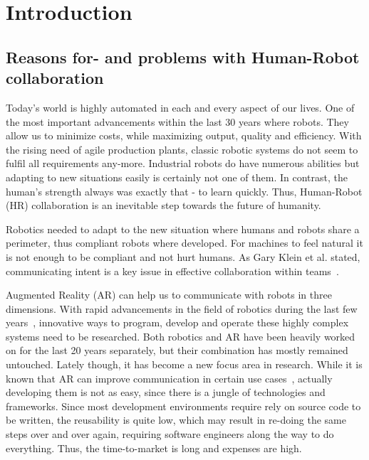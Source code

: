 \chapter{Introduction}\label{Chap:Introduction}

\section{Reasons for- and problems with Human-Robot collaboration}\label{Section:ProblemDescription}
Today's world is highly automated in each and every aspect of our lives. One of the most important advancements within the last 30 years where robots. They allow us to minimize costs, while maximizing output, quality and efficiency. With the rising need of agile production plants, classic robotic systems do not seem to fulfil all requirements any-more. Industrial robots do have numerous abilities but adapting to new situations easily is certainly not one of them. In contrast, the human's strength always was exactly that - to learn quickly. Thus, Human-Robot (HR) collaboration is an inevitable step towards the future of humanity.

Robotics needed to adapt to the new situation where humans and robots share a perimeter, thus compliant robots where developed. For machines to feel natural it is not enough to be compliant and not hurt humans. As Gary Klein et al. stated, communicating intent is a key issue in effective collaboration within teams~\cite{klein2005common}. 

Augmented Reality (AR) can help us to communicate with robots in three dimensions. With rapid advancements in the field of robotics during the last few years~\cite{laschi2016soft}, innovative ways to program, develop and operate these highly complex systems need to be researched. Both robotics and AR have been heavily worked on for the last 20 years separately, but their combination has mostly remained untouched. Lately though, it has become a new focus area in research. While it is known that AR can improve communication in certain use cases~\cite{ARCommunicationBenefits}, actually developing them is not as easy, since there is a jungle of technologies and frameworks. Since most development environments require rely on source code to be written, the reusability is quite low, which may result in re-doing the same steps over and over again, requiring software engineers along the way to do everything. Thus, the time-to-market is long and expenses are high.

